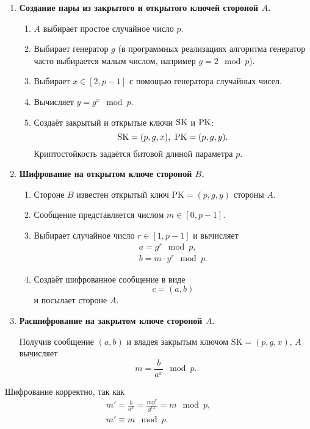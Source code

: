\begin{enumerate}
    \item \textbf{Создание пары из закрытого и открытого ключей стороной $A$.}
        \begin{enumerate}
            \item $A$ выбирает простое случайное число $p$.
            \item Выбирает генератор $g$ (в программных реализациях алгоритма генератор часто выбирается малым числом, например $g = 2 \mod p$).
            \item Выбирает $x \in [2, p - 1]$ с помощью генератора случайных чисел.
            \item Вычисляет $y=g^{x}\mod p$.
            \item Создаёт закрытый и открытые ключи $\textrm{SK}$ и $\textrm{PK}$:
                \[ \textrm{SK} = (p, g, x), ~ \textrm{PK} = (p, g, y). \]
                Криптостойкость задаётся битовой длиной параметра $p$.
        \end{enumerate}
    \item \textbf{Шифрование на открытом ключе стороной $B$.}
        \begin{enumerate}
            \item Стороне $B$ известен открытый ключ $\text{PK} = (p, g, y)$ стороны $A$.
            \item Сообщение представляется числом $m \in [0, p-1]$.
            \item Выбирает случайное число $r \in [1, p-1]$ и вычисляет
                \[ \begin{array}{l}
                    a = g^r \mod p, \\
                    b = m \cdot y^r \mod p.
                \end{array} \]
            \item Создаёт шифрованное сообщение в виде
                \[ c = (a, b) \]
                и посылает стороне $A$.
        \end{enumerate}
    \item \textbf{Расшифрование на закрытом ключе стороной $A$.}

	Получив сообщение $(a, b)$ и владея закрытым ключом $\text{SK} = (p, g, x)$, $A$ вычисляет
                \[ m = \frac{b}{a^x} \mod p. \]
\end{enumerate}

Шифрование корректно, так как 
\[ \begin{array}{l}
    m' = \frac{b}{a^x} = \frac{m y^r}{g^{rx}} = m \mod p, \\
    m' \equiv m \mod p.
\end{array} \]

